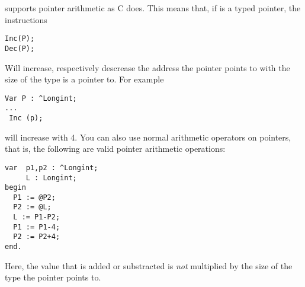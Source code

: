 \documentclass{report}
\begin{document}
\fpc supports pointer arithmetic as C does. This means that, if  is a
typed pointer, the instructions
\begin{verbatim}
Inc(P);
Dec(P);
\end{verbatim}
Will increase, respectively descrease the address the pointer points to
with the size of the type  is a pointer to. For example
\begin{verbatim}
Var P : ^Longint;
...
 Inc (p);
\end{verbatim}
will increase  with 4.
You can also use normal arithmetic operators on pointers, that is, the
following are valid pointer arithmetic operations:
\begin{verbatim}
var  p1,p2 : ^Longint;
     L : Longint;
begin
  P1 := @P2;
  P2 := @L;
  L := P1-P2;
  P1 := P1-4;
  P2 := P2+4;
end.
\end{verbatim}
Here, the value that is added or substracted is {\em not} multiplied by the
size of the type the pointer points to.
\end{document}
